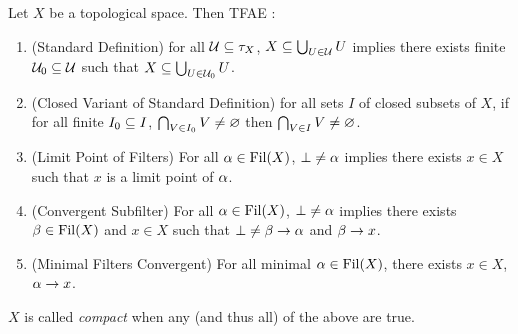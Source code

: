 \documentclass[main.tex]{subfiles}
\begin{document}
\begin{prop} 
  
  Let $X$ be a topological space. 
  Then TFAE : 
  \begin{enumerate}
    \item (Standard Definition) for all $\mathcal{U} \subseteq \tau_X$,
    $X \subseteq \bigcup_{U \in \mathcal{U}} U$ implies 
    there exists finite $\mathcal{U}_0 \subseteq \mathcal{U}$ such that 
    $X \subseteq \bigcup_{U \in \mathcal{U}_0} U$.
    \item (Closed Variant of Standard Definition)
    for all sets $I$ of closed subsets of $X$,
    if for all finite $I_0 \subseteq I$, $\bigcap_{V \in I_0} V \neq \varnothing$
    then $\bigcap_{V \in I} V \neq \varnothing$.
    \item (Limit Point of Filters) For all $\alpha \in \operatorname{Fil}(X)$,
    $\bot \neq \alpha$ implies 
    there exists $x \in X$ such that $x$ is a limit point of $\alpha$.
    \item (Convergent Subfilter) For all $\alpha \in \operatorname{Fil}(X)$,
    $\bot \neq \alpha$ implies 
    there exists $\beta \in \operatorname{Fil}(X)$ and $x \in X$
    such that $\bot \neq \beta \to \alpha$ and $\beta \to x$.
    \item (Minimal Filters Convergent) For all minimal $\alpha \in \operatorname{Fil}(X)$,
    there exists $x \in X$, $\alpha \to x$.
  \end{enumerate}
  $X$ is called \emph{compact} when any (and thus all)
  of the above are true. 
\end{prop}
\end{document}
